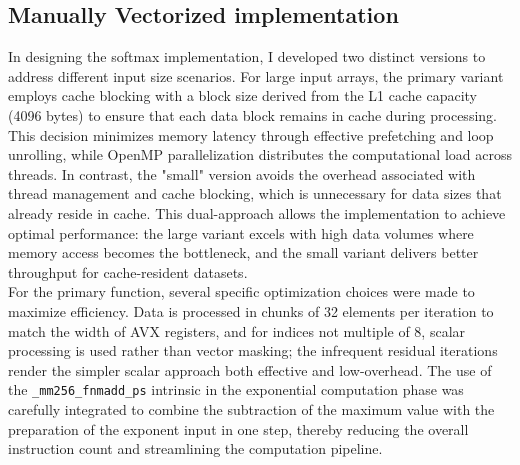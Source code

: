 \documentclass[11pt]{article}
\begin{document}
\subsection{Manually Vectorized implementation}
In designing the softmax implementation, I developed two distinct versions to address different input size scenarios. For large input arrays, the primary variant employs cache blocking with a block size derived from the L1 cache capacity (4096 bytes) to ensure that each data block remains in cache during processing. This decision minimizes memory latency through effective prefetching and loop unrolling, while OpenMP parallelization distributes the computational load across threads. In contrast, the "small" version avoids the overhead associated with thread management and cache blocking, which is unnecessary for data sizes that already reside in cache. This dual-approach allows the implementation to achieve optimal performance: the large variant excels with high data volumes where memory access becomes the bottleneck, and the small variant delivers better throughput for cache-resident datasets. \\

For the primary function, several specific optimization choices were made to maximize efficiency. Data is processed in chunks of 32 elements per iteration to match the width of AVX registers, and for indices not multiple of 8, scalar processing is used rather than vector masking; the infrequent residual iterations render the simpler scalar approach both effective and low-overhead. The use of the \texttt{\_mm256\_fnmadd\_ps} intrinsic in the exponential computation phase was carefully integrated to combine the subtraction of the maximum value with the preparation of the exponent input in one step, thereby reducing the overall instruction count and streamlining the computation pipeline.
\end{document}
